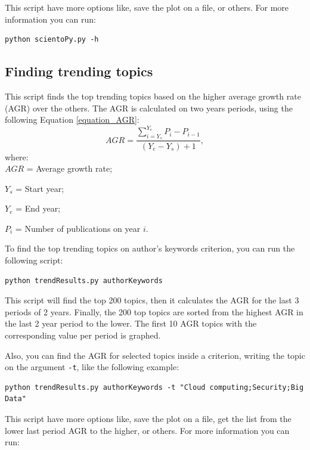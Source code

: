 \documentclass[10pt,letterpaper]{article}
\begin{document}
This script have more options like, save the plot on a file, or others. For more information you can run:

\begin{verbatim}
python scientoPy.py -h
\end{verbatim}

\subsection{Finding trending topics}

This script finds the top trending topics based on the higher average growth rate (AGR) over the others. The AGR is calculated on two years periods, using the following Equation \eqref{equation_AGR}:
\begin{equation}
AGR = \frac{\sum\limits_{i = Y_s}^{Y_e}P_i - P_{i-1}}{(Y_e - Y_s)+1},  
\label{equation_AGR}
\end{equation}
where:\\
$AGR$ = Average growth rate;
	
	$Y_s$ = Start year;
	
	$Y_e$ = End year;
	
	$P_i$ = Number of publications on year $i.$
\newline


To find the top trending topics on author's keywords criterion, you can run the following script: 

\begin{verbatim}
python trendResults.py authorKeywords
\end{verbatim}

This script will find the top 200 topics, then it calculates the AGR for the last 3 periods of 2 years. Finally, the 200 top topics are sorted from the highest AGR in the last 2 year period to the lower. The first 10 AGR topics with the corresponding value per period is graphed. 

Also, you can find the AGR for selected topics inside a criterion, writing the topic on the argument \verb|-t|, like the following example: 

\begin{verbatim}
python trendResults.py authorKeywords -t "Cloud computing;Security;Big Data"
\end{verbatim}

This script have more options like, save the plot on a file, get the list from the lower last period AGR to the higher, or others. For more information you can run:
\end{document}
